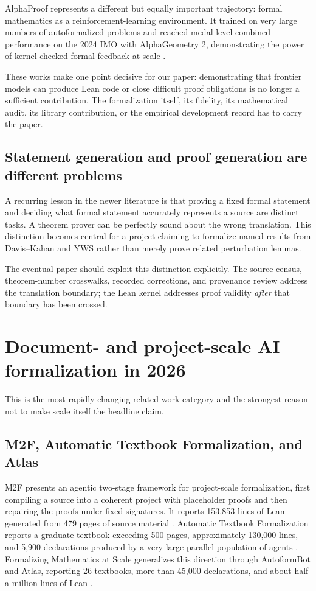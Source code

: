 \documentclass[11pt]{article}
\begin{document}
AlphaProof represents a different but equally important trajectory: formal
mathematics as a reinforcement-learning environment.  It trained on very large
numbers of autoformalized problems and reached medal-level combined performance
on the 2024 IMO with AlphaGeometry 2, demonstrating the power of kernel-checked
formal feedback at scale \citep{hubert2026alphaproof}.

These works make one point decisive for our paper: demonstrating that frontier
models can produce Lean code or close difficult proof obligations is no longer a
sufficient contribution.  The formalization itself, its fidelity, its
mathematical audit, its library contribution, or the empirical development
record has to carry the paper.

\subsection{Statement generation and proof generation are different problems}

A recurring lesson in the newer literature is that proving a fixed formal
statement and deciding what formal statement accurately represents a source are
distinct tasks.  A theorem prover can be perfectly sound about the wrong
translation.  This distinction becomes central for a project claiming to
formalize named results from Davis--Kahan and YWS rather than merely prove
related perturbation lemmas.

The eventual paper should exploit this distinction explicitly.  The source
census, theorem-number crosswalks, recorded corrections, and provenance review
address the translation boundary; the Lean kernel addresses proof validity
\emph{after} that boundary has been crossed.

\section{Document- and project-scale AI formalization in 2026}
\label{sec:scale2026}

This is the most rapidly changing related-work category and the strongest reason
not to make scale itself the headline claim.

\subsection{M2F, Automatic Textbook Formalization, and Atlas}

M2F presents an agentic two-stage framework for project-scale formalization,
first compiling a source into a coherent project with placeholder proofs and
then repairing the proofs under fixed signatures.  It reports 153,853 lines of
Lean generated from 479 pages of source material \citep{wang2026m2f}.  Automatic
Textbook Formalization reports a graduate textbook exceeding 500 pages,
approximately 130,000 lines, and 5,900 declarations produced by a very large
parallel population of agents \citep{gloeckle2026textbook}.  Formalizing
Mathematics at Scale generalizes this direction through AutoformBot and Atlas,
reporting 26 textbooks, more than 45,000 declarations, and about half a million
lines of Lean \citep{rammal2026scale}.
\end{document}
